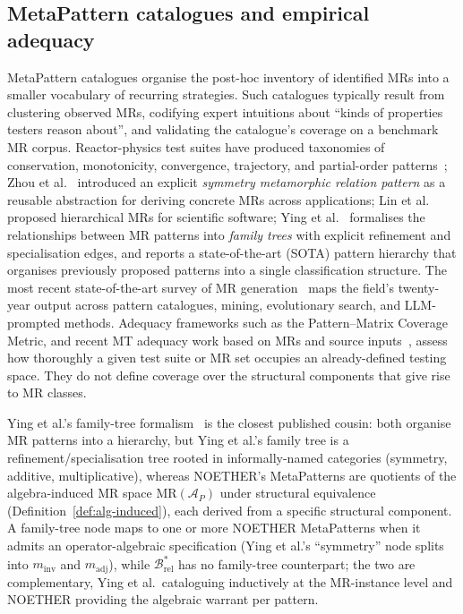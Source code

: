 \documentclass[manuscript]{acmart}
\begin{document}
\subsection{MetaPattern catalogues and empirical adequacy}

MetaPattern catalogues organise the post-hoc inventory of identified MRs into a smaller vocabulary of recurring strategies. Such catalogues typically result from clustering observed MRs, codifying expert intuitions about ``kinds of properties testers reason about'', and validating the catalogue's coverage on a benchmark MR corpus. Reactor-physics test suites have produced taxonomies of conservation, monotonicity, convergence, trajectory, and partial-order patterns~\cite{BellGlasstone1970, LewisMiller1993}; Zhou et al.~\cite{Zhou2020SymmetryMRP} introduced an explicit \emph{symmetry metamorphic relation pattern} as a reusable abstraction for deriving concrete MRs across applications; Lin et al.~\cite{Lin2018HierarchicalMR} proposed hierarchical MRs for scientific software; Ying et al.~\cite{Ying2025MRPatterns} formalises the relationships between MR patterns into \emph{family trees} with explicit refinement and specialisation edges, and reports a state-of-the-art (SOTA) pattern hierarchy that organises previously proposed patterns into a single classification structure. The most recent state-of-the-art survey of MR generation~\cite{LiTOSEM2025} maps the field's twenty-year output across pattern catalogues, mining, evolutionary search, and LLM-prompted methods. Adequacy frameworks such as the Pattern--Matrix Coverage Metric, and recent MT adequacy work based on MRs and source inputs~\cite{Fu2024MTAdequacy}, assess how thoroughly a given test suite or MR set occupies an already-defined testing space. They do not define coverage over the structural components that give rise to MR classes.

Ying et al.'s family-tree formalism~\cite{Ying2025MRPatterns} is the closest published cousin: both organise MR patterns into a hierarchy, but Ying et al.'s family tree is a refinement/specialisation tree rooted in informally-named categories (symmetry, additive, multiplicative), whereas NOETHER's MetaPatterns are quotients of the algebra-induced MR space $\mathrm{MR}(\mathcal{A}_P)$ under structural equivalence (Definition~\ref{def:alg-induced}), each derived from a specific structural component. A family-tree node maps to one or more NOETHER MetaPatterns when it admits an operator-algebraic specification (Ying et al.'s ``symmetry'' node splits into $m_{\mathrm{inv}}$ and $m_{\mathrm{adj}}$), while $\mathcal{B}^{*}_{\mathrm{rel}}$ has no family-tree counterpart; the two are complementary, Ying et al.\ cataloguing inductively at the MR-instance level and NOETHER providing the algebraic warrant per pattern.
\end{document}
